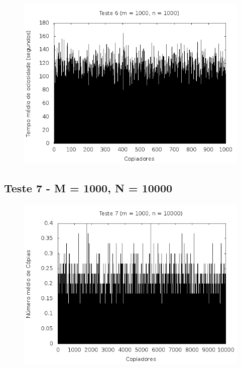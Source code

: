 \documentclass[12pt,a4paper]{article}
\begin{document}
\begin{center}
\begin{figure}[H]
    \center
    \includegraphics[scale=0.5]{imagens/grafico_ociosidade6.png}
    \label{teste6_ociosidade}
\end{figure}
\end{center}

\pagebreak
\subsection{Teste 7 - M = 1000, N = 10000}
\begin{center}
\begin{figure}[H]
    \center
    \includegraphics[scale=0.5]{imagens/grafico_copias7.png}
    \label{teste7_copias}
\end{figure}
\end{center}
\end{document}
